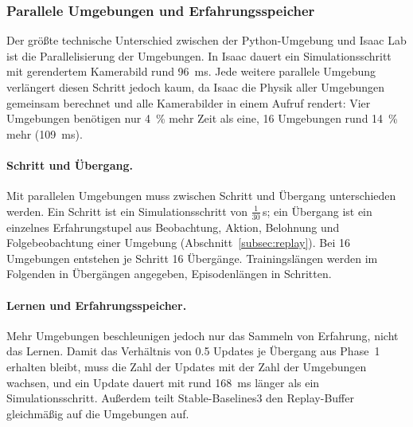 \FloatBarrier

\subsubsection{Parallele Umgebungen und Erfahrungsspeicher}
\label{subsec:3d_parallel}

Der größte technische Unterschied zwischen der Python-Umgebung und Isaac Lab ist die Parallelisierung der Umgebungen. In Isaac dauert ein Simulationsschritt mit gerendertem Kamerabild rund \SI{96}{\milli\second}. Jede weitere parallele Umgebung verlängert diesen Schritt jedoch kaum, da Isaac die Physik aller Umgebungen gemeinsam berechnet und alle Kamerabilder in einem Aufruf rendert: Vier Umgebungen benötigen nur \SI{4}{\percent} mehr Zeit als eine, 16 Umgebungen rund \SI{14}{\percent} mehr (\SI{109}{\milli\second}).

\paragraph{Schritt und Übergang.}
Mit parallelen Umgebungen muss zwischen Schritt und Übergang unterschieden werden. Ein Schritt ist ein Simulationsschritt von $\tfrac{1}{30}$\,\si{\second}; ein Übergang ist ein einzelnes Erfahrungstupel aus Beobachtung, Aktion, Belohnung und Folgebeobachtung einer Umgebung (Abschnitt~\ref{subsec:replay}). Bei 16 Umgebungen entstehen je Schritt 16 Übergänge. Trainingslängen werden im Folgenden in Übergängen angegeben, Episodenlängen in Schritten.

\paragraph{Lernen und Erfahrungsspeicher.}
Mehr Umgebungen beschleunigen jedoch nur das Sammeln von Erfahrung, nicht das Lernen. Damit das Verhältnis von \num{0.5} Updates je Übergang aus Phase~1 erhalten bleibt, muss die Zahl der Updates mit der Zahl der Umgebungen wachsen, und ein Update dauert mit rund \SI{168}{\milli\second} länger als ein Simulationsschritt. Außerdem teilt Stable-Baselines3 den Replay-Buffer gleichmäßig auf die Umgebungen auf.


